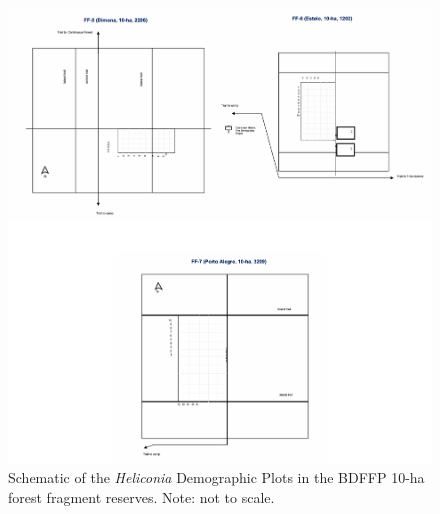 \documentclass[
  12pt,
  man, donotrepeattitle,floatsintext]{apa6}
\begin{document}
\newpage
\begin{figure}[h]

{\centering \includegraphics{Bruna_etal_MetadataS1_files/figure-latex/plotsten-1} 

}

\caption{Schematic of the \textit{Heliconia} Demographic Plots in the BDFFP 10-ha forest fragment reserves. Note: not to scale.}\label{fig:plotsten}
\end{figure}
\newpage
\end{document}

